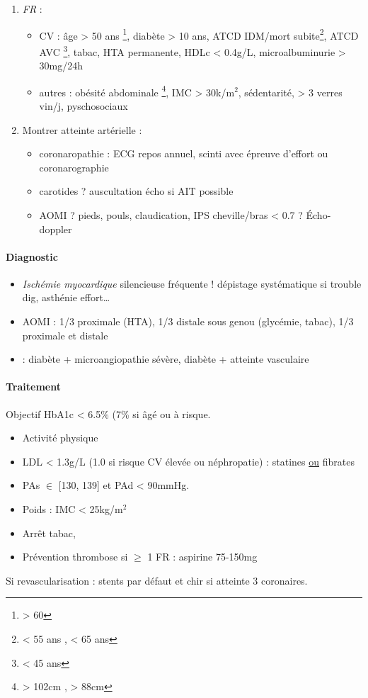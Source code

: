 \documentclass{book}
\begin{document}
\begin{enumerate}
\item \emph{FR} :
\begin{itemize}
\item CV : âge > 50 ans \male \footnote{> 60 \female}, diabète > 10 ans, ATCD IDM/mort
subite\footnote{< 55 ans \male, < 65 ans \female}, ATCD AVC \footnote{< 45 ans},  tabac, HTA permanente, HDLc < 0.4g/L, microalbuminurie > 30mg/24h
\item autres : obésité abdominale \footnote{> 102cm \male, > 88cm \female}, IMC > 30k/m\(^{\text{2}}\), sédentarité, > 3 verres vin/j, pyschosociaux
\end{itemize}

\item Montrer atteinte artérielle : 
\begin{itemize}
\item coronaropathie : ECG repos annuel, scinti avec épreuve d'effort ou coronarographie
\item carotides ? auscultation \thus écho si AIT possible
\item AOMI ? pieds, pouls, claudication, IPS cheville/bras < 0.7 ? Écho-doppler
\end{itemize}
\end{enumerate}

\paragraph{Diagnostic}
\label{sec:org54d89f6}
\begin{itemize}
\item \emph{Ischémie myocardique} silencieuse fréquente ! \thus dépistage systématique si
trouble dig, asthénie effort\ldots{}
\item AOMI : 1/3 proximale (HTA), 1/3 distale sous genou (glycémie, tabac), 1/3 proximale et distale
\item \faBomb : diabète + microangiopathie sévère, diabète + atteinte vasculaire
\end{itemize}

\paragraph{Traitement}
\label{sec:org9eb8e58}
Objectif HbA1c < 6.5\% (7\% si âgé ou à risque.
\begin{itemize}
\item Activité physique
\item LDL < 1.3g/L (1.0 si risque CV élevée ou néphropatie) : statines \uline{ou} fibrates
\item PAs \(\in\) [130, 139] et PAd < 90mmHg.
\item Poids : IMC < 25kg/m\(^{\text{2}}\)
\item Arrêt tabac,
\item Prévention thrombose si \(\ge\) 1 FR : aspirine 75-150mg
\end{itemize}
Si revascularisation : stents par défaut  et chir si atteinte 3 coronaires.
\end{document}
